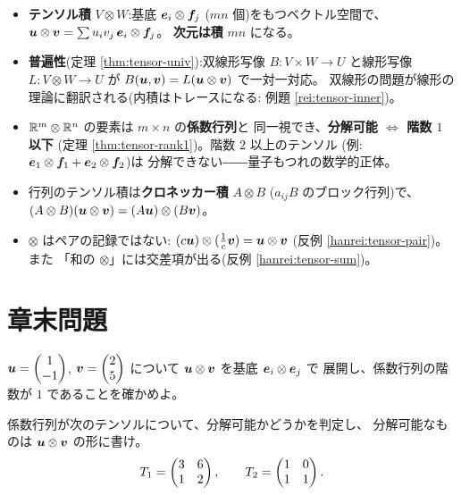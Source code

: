 \begin{matome}
\begin{itemize}
\item \textbf{テンソル積} $V \otimes W$:基底 $\bm{e}_i \otimes \bm{f}_j$
($mn$ 個)をもつベクトル空間で、
$\bm{u} \otimes \bm{v} = \sum u_i v_j\,\bm{e}_i \otimes \bm{f}_j$。
\textbf{次元は積} $mn$ になる。
\item \textbf{普遍性}(定理 \ref{thm:tensor-univ}):双線形写像
$B : V \times W \to U$ と線形写像 $L : V \otimes W \to U$ が
$B(\bm{u}, \bm{v}) = L(\bm{u} \otimes \bm{v})$ で一対一対応。
双線形の問題が線形の理論に翻訳される(内積はトレースになる:
例題 \ref{rei:tensor-inner})。
\item $\mathbb{R}^m \otimes \mathbb{R}^n$ の要素は $m \times n$ の\textbf{係数行列}と
同一視でき、\textbf{分解可能 $\iff$ 階数 $1$ 以下}
(定理 \ref{thm:tensor-rank1})。階数 $2$ 以上のテンソル
(例:$\bm{e}_1 \otimes \bm{f}_1 + \bm{e}_2 \otimes \bm{f}_2$)は
分解できない――量子もつれの数学的正体。
\item 行列のテンソル積は\textbf{クロネッカー積} $A \otimes B$
($a_{ij}B$ のブロック行列)で、
$(A \otimes B)(\bm{u} \otimes \bm{v}) = (A\bm{u}) \otimes (B\bm{v})$。
\item $\otimes$ はペアの記録ではない:
$(c\bm{u}) \otimes (\frac{1}{c}\bm{v}) = \bm{u} \otimes \bm{v}$
(反例 \ref{hanrei:tensor-pair})。また
「和の $\otimes$」には交差項が出る(反例 \ref{hanrei:tensor-sum})。
\end{itemize}
\end{matome}

\section*{章末問題}

\begin{mondai}[基本]\label{q:tensor-ex1}
$\bm{u} = \begin{pmatrix}1 \\ -1\end{pmatrix}$, $\bm{v} = \begin{pmatrix}2 \\ 5\end{pmatrix}$ について
$\bm{u} \otimes \bm{v}$ を基底 $\bm{e}_i \otimes \bm{e}_j$ で
展開し、係数行列の階数が $1$ であることを確かめよ。
\end{mondai}

\begin{mondai}[基本]\label{q:tensor-ex2}
係数行列が次のテンソルについて、分解可能かどうかを判定し、
分解可能なものは $\bm{u} \otimes \bm{v}$ の形に書け。
\[
T_1 = \begin{pmatrix}3 & 6 \\ 1 & 2\end{pmatrix}, \qquad T_2 = \begin{pmatrix}1 & 0 \\ 1 & 1\end{pmatrix}.
\]
\end{mondai}

